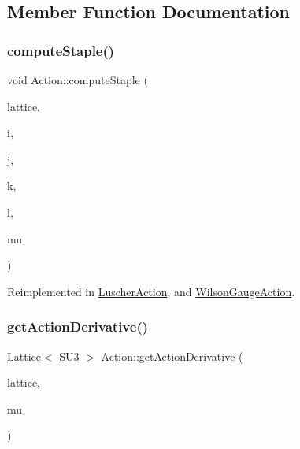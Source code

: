 \subsection{Member Function Documentation}
\mbox{\label{class_action_a2d5a64b47a8913955e5911ca072ff80d}} 
\subsubsection{\texorpdfstring{computeStaple()}{computeStaple()}}
{\footnotesize\ttfamily void Action\+::compute\+Staple (\begin{DoxyParamCaption}\item[{\mbox{\hyperlink{class_lattice}{Lattice}}$<$ \mbox{\hyperlink{class_s_u3}{S\+U3}} $>$ $\ast$}]{lattice,  }\item[{unsigned int}]{i,  }\item[{unsigned int}]{j,  }\item[{unsigned int}]{k,  }\item[{unsigned int}]{l,  }\item[{int}]{mu }\end{DoxyParamCaption})\hspace{0.3cm}{\ttfamily [virtual]}}



Reimplemented in \mbox{\hyperlink{class_luscher_action_a42285b6e3015935588e1fab6b90c1a11}{Luscher\+Action}}, and \mbox{\hyperlink{class_wilson_gauge_action_af1f6ba42fcc2b923dc3b37bf150bfae9}{Wilson\+Gauge\+Action}}.

\mbox{\label{class_action_a78168dd7c3819a3365e28fc1aae1b9b6}} 
\subsubsection{\texorpdfstring{getActionDerivative()}{getActionDerivative()}}
{\footnotesize\ttfamily \mbox{\hyperlink{class_lattice}{Lattice}}$<$ \mbox{\hyperlink{class_s_u3}{S\+U3}} $>$ Action\+::get\+Action\+Derivative (\begin{DoxyParamCaption}\item[{\mbox{\hyperlink{class_lattice}{Lattice}}$<$ \mbox{\hyperlink{class_s_u3}{S\+U3}} $>$ $\ast$}]{lattice,  }\item[{int}]{mu }\end{DoxyParamCaption})\hspace{0.3cm}{\ttfamily [virtual]}}



